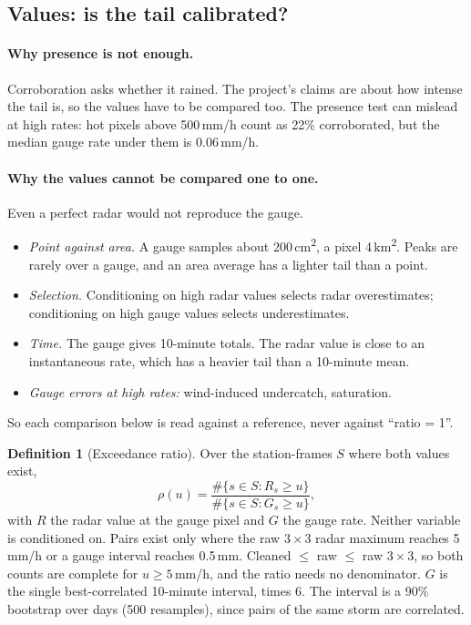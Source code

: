 \documentclass[11pt,a4paper]{article}
\theoremstyle{definition}
\newtheorem{definition}{Definition}
\theoremstyle{remark}
\newcommand{\1}{\mathbf{1}}
\begin{document}
\subsection{Values: is the tail calibrated?}\label{sec:values}

\paragraph{Why presence is not enough.} Corroboration asks whether it rained. The project's
claims are about how intense the tail is, so the values have to be compared too. The
presence test can mislead at high rates: hot pixels above 500\,mm/h count as 22\%
corroborated, but the median gauge rate under them is 0.06\,mm/h.

\paragraph{Why the values cannot be compared one to one.} Even a perfect radar would not
reproduce the gauge.
\begin{itemize}[nosep]
\item \emph{Point against area.} A gauge samples about 200\,cm\textsuperscript{2}, a pixel
  4\,km\textsuperscript{2}. Peaks are rarely over a gauge, and an area average has a
  lighter tail than a point.
\item \emph{Selection.} Conditioning on high radar values selects radar overestimates;
  conditioning on high gauge values selects underestimates.
\item \emph{Time.} The gauge gives 10-minute totals. The radar value is close to an
  instantaneous rate, which has a heavier tail than a 10-minute mean.
\item \emph{Gauge errors at high rates:} wind-induced undercatch, saturation.
\end{itemize}
So each comparison below is read against a reference, never against ``ratio = 1''.

\begin{definition}[Exceedance ratio]
Over the station-frames $S$ where both values exist,
\[
  \rho(u)=\frac{\#\{s\in S: R_s\ge u\}}{\#\{s\in S: G_s\ge u\}},
\]
with $R$ the radar value at the gauge pixel and $G$ the gauge rate. Neither variable is
conditioned on. Pairs exist only where the raw $3\times3$ radar maximum reaches 5\,mm/h or a
gauge interval reaches 0.5\,mm. Cleaned $\le$ raw $\le$ raw $3\times3$, so both counts are
complete for $u\ge5$\,mm/h, and the ratio needs no denominator. $G$ is the single
best-correlated 10-minute interval, times 6. The interval is a 90\% bootstrap over days
(500 resamples), since pairs of the same storm are correlated.
\end{definition}
\end{document}
